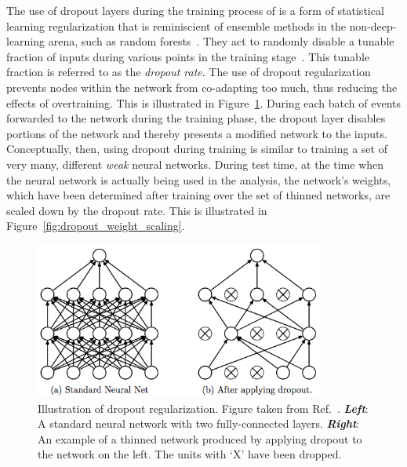 The use of dropout layers during the training process of is a form of statistical learning regularization that is reminiscient
of ensemble methods in the non-deep-learning arena, such as random forests~\cite{RandomForestsBreiman2001}.
They act to randomly disable a tunable fraction of inputs during various points in the training stage~\cite{JMLRDropout}.
This tunable fraction is referred to as the \textit{dropout rate}.
The use of dropout regularization prevents nodes within the network from co-adapting too much, thus reducing
the effects of overtraining.
This is illustrated in Figure~\ref{fig:dropout_illustration}.
During each batch of events forwarded to the network during the training phase, the dropout layer disables
portions of the network and thereby presents a modified network to the inputs.
Conceptually, then, using dropout during training is similar to training a set of very many, different \textit{weak}
neural networks.
During test time, at the time when the neural network is actually being used in the analysis,
the network's weights, which have been determined after training over the set of thinned networks,
are scaled down by the dropout rate.
This is illustrated in Figure~\ref{fig:dropout_weight_scaling}.

\begin{figure}[!htb]
    \begin{center}
        \includegraphics[width=0.85\textwidth]{figures/search_hh/mva/dropout_illustration}
        \caption{
            Illustration of dropout regularization. Figure taken from Ref.~\cite{JMLRDropout}.
            \textit{\textbf{Left}}: A standard neural network with two fully-connected layers.
            \textit{\textbf{Right}}: An example of a thinned network produced by applying dropout to the
                network on the left.
                The units with `X' have been dropped.
        }
        \label{fig:dropout_illustration}
    \end{center}
\end{figure}

